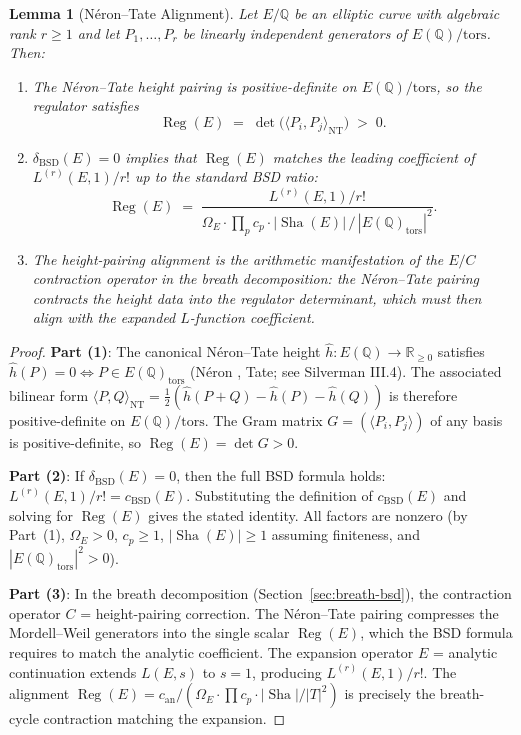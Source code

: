 \documentclass[11pt]{article}
\newtheorem{lemma}[theorem]{Lemma}
\DeclareMathOperator{\Reg}{Reg}
\DeclareMathOperator{\Sha}{Sha}
\begin{document}
\begin{lemma}[N\'eron--Tate Alignment]
\label{lem:neron-tate-align}
Let $E/\mathbb{Q}$ be an elliptic curve with algebraic rank $r \geq 1$ and
let $P_1, \ldots, P_r$ be linearly independent generators of
$E(\mathbb{Q})/\mathrm{tors}$.  Then:
\begin{enumerate}
  \item The N\'eron--Tate height pairing is positive-definite on
    $E(\mathbb{Q})/\mathrm{tors}$, so the regulator satisfies
    \[
      \Reg(E) \;=\; \det\bigl(\langle P_i, P_j \rangle_{\mathrm{NT}}\bigr)
      \;>\; 0.
    \]
  \item $\delta_{\mathrm{BSD}}(E) = 0$ implies that $\Reg(E)$ matches the
    leading coefficient of $L^{(r)}(E,1)/r!$ up to the standard BSD ratio:
    \[
      \Reg(E) \;=\;
      \frac{L^{(r)}(E,1)/r!}
           {\Omega_E \cdot \prod_p c_p \cdot |\Sha(E)|\,/\,
            |E(\mathbb{Q})_{\mathrm{tors}}|^2}.
    \]
  \item The height-pairing alignment is the arithmetic manifestation of the
    $E/C$ contraction operator in the breath decomposition: the N\'eron--Tate
    pairing \emph{contracts} the height data into the regulator determinant,
    which must then align with the \emph{expanded} $L$-function coefficient.
\end{enumerate}
\end{lemma}

\begin{proof}
\textbf{Part (1)}: The canonical N\'eron--Tate height
$\hat{h} \colon E(\mathbb{Q}) \to \mathbb{R}_{\geq 0}$ satisfies
$\hat{h}(P) = 0 \Leftrightarrow P \in E(\mathbb{Q})_{\mathrm{tors}}$
(N\'eron \cite{Neron}, Tate; see Silverman \cite{SilvAdv} III.4).
The associated bilinear form $\langle P, Q \rangle_{\mathrm{NT}} =
\tfrac{1}{2}(\hat{h}(P+Q) - \hat{h}(P) - \hat{h}(Q))$ is therefore
positive-definite on $E(\mathbb{Q})/\mathrm{tors}$.  The Gram matrix
$G = (\langle P_i, P_j \rangle)$ of any basis is positive-definite, so
$\Reg(E) = \det G > 0$.

\textbf{Part (2)}: If $\delta_{\mathrm{BSD}}(E) = 0$, then the full BSD
formula holds: $L^{(r)}(E,1)/r! = c_{\mathrm{BSD}}(E)$.  Substituting the
definition of $c_{\mathrm{BSD}}(E)$ and solving for $\Reg(E)$ gives the
stated identity.  All factors are nonzero (by Part~(1), $\Omega_E > 0$,
$c_p \geq 1$, $|\Sha(E)| \geq 1$ assuming finiteness, and
$|E(\mathbb{Q})_{\mathrm{tors}}|^2 > 0$).

\textbf{Part (3)}: In the breath decomposition (Section~\ref{sec:breath-bsd}),
the contraction operator $C$ = height-pairing correction.  The N\'eron--Tate
pairing compresses the Mordell--Weil generators into the single scalar
$\Reg(E)$, which the BSD formula requires to match the analytic coefficient.
The expansion operator $E$ = analytic continuation extends $L(E,s)$ to $s=1$,
producing $L^{(r)}(E,1)/r!$.  The alignment $\Reg(E) = c_{\mathrm{an}} /
(\Omega_E \cdot \prod c_p \cdot |\Sha|/|T|^2)$ is precisely the
breath-cycle contraction matching the expansion.
\end{proof}
\end{document}
